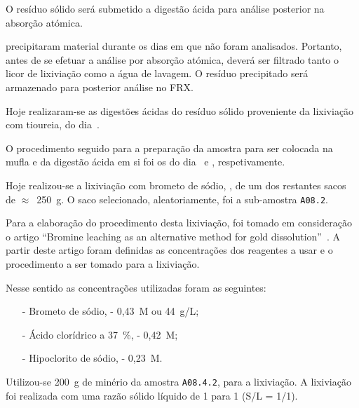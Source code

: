 {O resíduo sólido será submetido a digestão ácida para análise posterior na absorção atómica.

 precipitaram material durante os dias em que não foram analisados.
Portanto, antes de se efetuar a análise por absorção atómica, deverá ser filtrado tanto o licor de lixiviação como a água de lavagem. 
O resíduo precipitado será armazenado para posterior análise no FRX.

\hrulefill



Hoje realizaram-se as digestões ácidas do resíduo sólido proveniente da lixiviação com tioureia, do dia~.

O procedimento seguido para a preparação da amostra para ser colocada na mufla e da digestão ácida em si foi os do dia~ e , respetivamente.

\hrulefill



Hoje realizou-se a lixiviação com brometo de sódio, \bromo{}, de um dos restantes sacos de $\approx$~250~g.
O saco selecionado, aleatoriamente, foi a sub-amostra \texttt{A08.2}.

Para a elaboração do procedimento desta lixiviação, foi tomado em consideração o artigo ``Bromine leaching as an alternative method for gold dissolution''~\cite{bromo_2018}.
A partir deste artigo foram definidas as concentrações dos reagentes a usar e o procedimento a ser tomado para a lixiviação.

Nesse sentido as concentrações utilizadas foram as seguintes:
\begin{itemize}
    \item[-] Brometo de sódio, \bromo{} - 0,43~M ou 44~g/L;
    \item[-] Ácido clorídrico a 37~\%, \acl{} - 0,42~M;
    \item[-] Hipoclorito de sódio, \hipso{} - 0,23~M.  
\end{itemize}

Utilizou-se 200~g de minério da amostra \texttt{A08.4.2}, para a lixiviação.
A lixiviação foi realizada com uma razão sólido líquido de 1 para 1 (S/L = 1/1).

}
